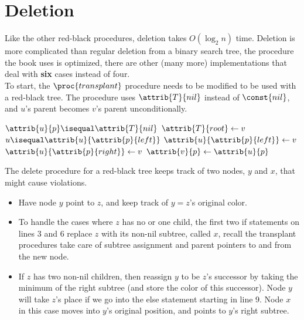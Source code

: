 \documentclass{article}
\begin{document}
\newpage

\section*{Deletion}
Like the other red-black procedures, deletion takes $O(\log_2n)$ time. Deletion is more complicated than regular deletion from a binary search tree, the procedure the book uses is optimized, there are other (many more) implementations that deal with \textbf{six} cases instead of four.
\\
To start, the $\proc{transplant}$ procedure needs to be modified to be used with a red-black tree. The procedure uses $\attrib{T}{nil}$ instead of $\const{nil}$, and $u$'s parent becomes $v$'s parent unconditionally.

\begin{codebox}
\li \If $\attrib{u}{p} \isequal \attrib{T}{nil}$
\li \Then
        $\attrib{T}{root} \gets{v}$
\li \ElseIf $u \isequal \attrib{u}{\attrib{p}{left}}$
\li \Then
        $\attrib{u}{\attrib{p}{left}} \gets{v}$
\li \Else
\li     $\attrib{u}{\attrib{p}{right}} \gets{v}$
    \End
\li $\attrib{v}{p} \gets{\attrib{u}{p}}$
\end{codebox}

The delete procedure for a red-black tree keeps track of two nodes, $y$ and $x$, that might cause violations.

\begin{itemize}
    \item Have node $y$ point to $z$, and keep track of $y = z$'s original color.
    \item To handle the cases where $z$ has no or one child, the first two if statements on lines 3 and 6 replace $z$ with its non-nil subtree, called $x$, recall the transplant procedures take care of subtree assignment and parent pointers to and from the new node.
    \item If $z$ has two non-nil children, then reassign $y$ to be $z$'s successor by taking the minimum of the right subtree (and store the color of this successor). Node $y$ will take $z$'s place if we go into the else statement starting in line 9. Node $x$ in this case moves into $y$'s original position, and points to $y$'s right subtree.
\end{itemize}

\newpage
\end{document}
